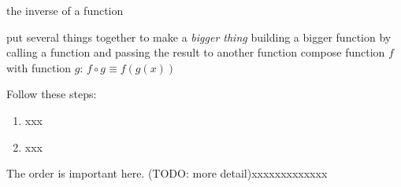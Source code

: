 \documentclass[fleqn,letterpaper,12pt,printwatermark=false]{memoir}
\begin{document}
\newcommand{\myClassName}{Pre-AP Algebra 2}
\newcommand{\myUnitNumber}{1}
\newcommand{\myUnitTitle}{Introduction to Functions}
\newcommand{\myLessonNumber}{8}
\newcommand{\myLessonTitle}{Composing Functions}



\pagestyle{myPagestyle}

\checkandfixthelayout
{}

\begin{myNotesHeader}
    \item {} the inverse of a function
\end{myNotesHeader}

\begin{myVocabulary}
        {
            put several things together to make a \emph{bigger thing}
        }
        {
            building a bigger function by calling a function and passing the result to another function
        }
        {
            compose function $f$ with function $g$: $f \circ g \equiv f(g(x))$
        }
\end{myVocabulary}

\begin{myKeyConcepts}
    Follow these steps:
    \begin{enumerate}
        \item xxx
        \item xxx
    \end{enumerate}
    The order is important here. (TODO: more detail)xxxxxxxxxxxxx
\end{myKeyConcepts}



  
\end{document}
